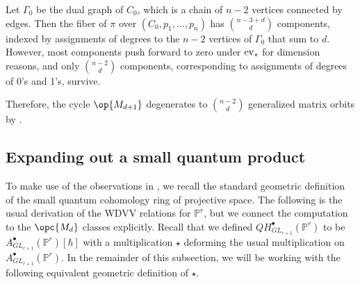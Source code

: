 \documentclass[12pt]{amsart}
\newcommand{\mb}{\mathbb}
\theoremstyle{plain}
\theoremstyle{definition}
\theoremstyle{remark}
\begin{document}
\begin{center}
\end{center}

Let $\Gamma_0$ be the dual graph of $C_0$, which is a chain of $n-2$ vertices connected by edges. Then the fiber of $\pi$ over $(C_0,p_1,\ldots,p_n)$ has $\binom{n-3+d}{d}$ components, indexed by assignments of degrees to the $n-2$ vertices of $\Gamma_0$ that sum to $d$. However, most components push forward to zero under ${\rm ev}_{*}$ for dimension reasons, and only $\binom{n-2}{d}$ components, corresponding to assignments of degrees of 0's and 1's, survive. 

Therefore, the cycle $\op{M_{d+1}}$ degenerates to $\binom{n-2}{d}$ generalized matrix orbits by .

\subsection{Expanding out a small quantum product} \label{expandquantum}
To make use of the observations in , we recall the standard geometric definition of the small quantum cohomology ring of projective space. The following is the usual derivation of the WDVV relations for $\mathbb{P}^r$, but we connect the computation to the $\opc{M_d}$ classes explicitly. Recall that we defined $QH^\bullet_{GL_{r+1}}(\mb{P}^r)$ to be $A^\bullet_{GL_{r+1}}(\mb{P}^r)[\hbar]$ with a multiplication $\star$ deforming the usual multiplication on $A^\bullet_{GL_{r+1}}(\mb{P}^r)$. In the remainder of this subsection, we will be working with the following equivalent geometric definition of $\star$.
\end{document}

